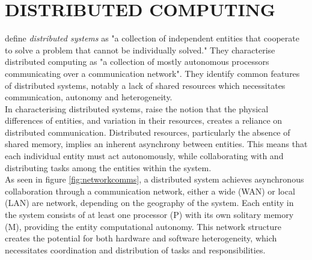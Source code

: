 \documentclass[../report.tex]{subfiles}
\begin{document}
\section{DISTRIBUTED COMPUTING}

\cite{kshemkalyani2011distributed} define \textit{distributed systems} as "a collection of independent entities that cooperate to solve a problem that cannot be individually solved." They characterise distributed computing as  "a collection of mostly autonomous processors communicating over a communication network". They identify common features of distributed systems, notably a lack of shared resources which necessitates communication, autonomy and heterogeneity. \\

In characterising distributed systems, \cite{kshemkalyani2011distributed} raise the notion that the physical differences of entities, and variation in their resources, creates a reliance on distributed communication. Distributed resources, particularly the absence of shared memory, implies an inherent asynchrony between entities. This means that each individual entity must act autonomously, while collaborating with and distributing tasks among the entities within the system. \\

As seen in figure \ref{fig:networkcomms}, a distributed system achieves asynchronous collaboration through a communication network, either a wide (WAN) or local (LAN) are network, depending on the geography of the system. Each entity in the system consists of at least one processor (P) with its own solitary memory (M), providing the entity computational autonomy. This network structure creates the potential for both hardware and software heterogeneity, which necessitates coordination and distribution of tasks and responsibilities.
\end{document}
